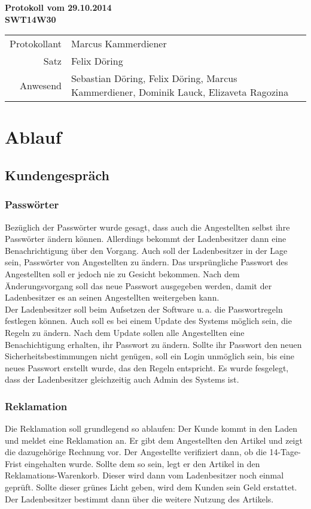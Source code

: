 \documentclass{scrartcl}
\begin{document}
\begin{center}
\LARGE \bf{Protokoll vom 29.10.2014 \\
SWT14W30}
\end{center}

\begin{tabular}{rp{10cm}}
Protokollant & Marcus Kammerdiener \\
Satz & Felix Döring \\
Anwesend & Sebastian Döring, Felix Döring, Marcus Kammerdiener, Dominik Lauck, Elizaveta Ragozina \\
\end{tabular}

\vspace*{3em}

\section{Ablauf}
\subsection{Kundengespr\"ach}
\subsubsection{Passw\"orter}
Bezüglich der Passwörter wurde gesagt, dass auch die Angestellten selbst ihre Passwörter ändern können. Allerdings
bekommt der Ladenbesitzer dann eine Benachrichtigung über den Vorgang. Auch soll der Ladenbesitzer in der Lage sein, Passwörter von Angestellten zu ändern. Das ursprüngliche Passwort des Angestellten soll er jedoch nie zu Gesicht bekommen. Nach dem Änderungsvorgang soll das neue Passwort ausgegeben werden, damit der Ladenbesitzer es an seinen Angestellten weitergeben kann.\\
Der Ladenbesitzer soll beim Aufsetzen der Software u.\,a. die Passwortregeln festlegen können. Auch soll es bei einem
Update des Systems möglich sein, die Regeln zu ändern. Nach dem Update sollen alle Angestellten eine Benachichtigung erhalten, ihr Passwort zu ändern. Sollte ihr Passwort den neuen Sicherheitsbestimmungen nicht genügen, soll ein Login unmöglich sein, bis eine neues Passwort erstellt wurde, das den Regeln entspricht. Es wurde fesgelegt, dass der Ladenbesitzer gleichzeitig auch Admin des Systems ist.
\subsubsection{Reklamation}
Die Reklamation soll grundlegend so ablaufen: Der Kunde kommt in den Laden und meldet eine Reklamation an. Er gibt
dem Angestellten den Artikel und zeigt die dazugehörige Rechnung vor. Der Angestellte verifiziert dann, ob die
14-Tage-Frist eingehalten wurde. Sollte dem so sein, legt er den Artikel in den Reklamations-Warenkorb. Dieser 
wird dann vom Ladenbesitzer noch einmal geprüft. Sollte dieser grünes Licht geben, wird dem Kunden sein Geld 
erstattet. Der Ladenbesitzer bestimmt dann über die weitere Nutzung des Artikels.
\end{document}
